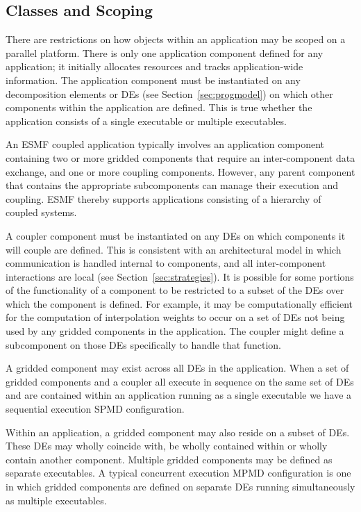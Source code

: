 \subsection{Classes and Scoping}

There are restrictions on how objects within an application may be scoped
on a parallel platform.  There is only one application component defined 
for any application; it initially allocates resources and tracks 
application-wide information. 
The application component must be instantiated on 
any decomposition elements or DEs (see Section~\ref{sec:progmodel}) on 
which other components
within the application are defined.  This is true whether the 
application consists of a single executable or multiple 
executables.  

An ESMF coupled application typically involves an application component 
containing two or more gridded components that require an 
inter-component data exchange, and one or more coupling 
components.  However, any parent component that contains the appropriate 
subcomponents can manage their execution and coupling.  ESMF thereby
supports applications consisting of a hierarchy of coupled systems.

A coupler component must be instantiated on any DEs on which components
it will couple are defined.  This is consistent with an architectural
model in which communication is handled internal to components, and all
inter-component interactions are local (see Section~\ref{sec:strategies}).  
It is possible for
some portions of the functionality of a component to be restricted to
a subset of the DEs over which the component is defined.  For example, 
it may be computationally efficient for the computation of interpolation
weights to occur on a set of DEs not being used by any gridded components
in the application.  The coupler might define a subcomponent on those DEs 
specifically to handle that function.

A gridded component may exist across all DEs in the application.  When 
a set of gridded  components and a coupler all execute in sequence on 
the same set of DEs and are contained within an application running 
as a single executable we have a sequential execution SPMD configuration.  

Within an application, a gridded component may also reside on 
a subset of DEs.  These DEs may wholly coincide with, be wholly 
contained within or wholly contain another component.  Multiple gridded 
components may be defined as separate executables.  A typical 
concurrent execution MPMD configuration is one in which gridded components 
are defined on separate DEs running simultaneously as multiple 
executables.  

